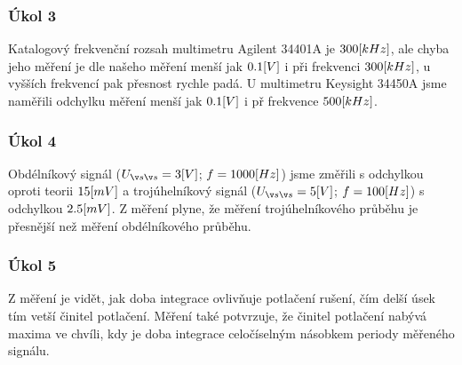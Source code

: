 \documentclass{article}
\begin{document}
\subsubsection*{Úkol 3}
Katalogový frekvenční rozsah multimetru Agilent 34401A je \(300\-[kHz]\), ale chyba jeho měření je dle našeho měření menší jak \(0.1\-[V]\) i při frekvenci \(300\-[kHz]\), u vyšších frekvencí pak přesnost rychle padá.
U multimetru Keysight 34450A jsme naměřili odchylku měření menší jak \(0.1\-[V]\) i př frekvence \(500\-[kHz]\).

\subsubsection*{Úkol 4}
Obdélníkový signál (\(U_{šš} = 3\-[V]\); \(f = 1000\-[Hz]\)) jsme změřili s odchylkou oproti teorii \(15\-[mV]\) a trojúhelníkový signál (\(U_{šš} = 5\-[V]\); \(f = 100\-[Hz]\)) s odchylkou \(2.5\-[mV]\).
Z měření plyne, že měření trojúhelníkového průběhu je přesnější než měření obdélníkového průběhu.

\subsubsection*{Úkol 5}
Z měření je vidět, jak doba integrace ovlivňuje potlačení rušení, čím delší úsek tím vetší činitel potlačení.
Měření také potvrzuje, že činitel potlačení nabývá maxima ve chvíli, kdy je doba integrace celočíselným násobkem periody měřeného signálu.
\end{document}
